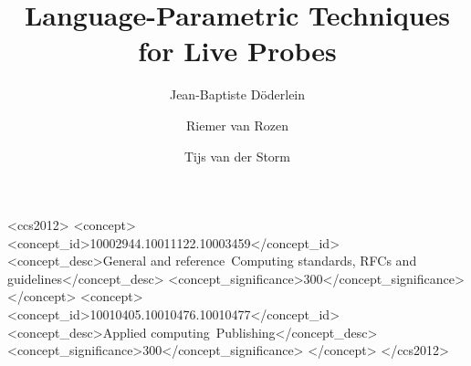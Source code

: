 \documentclass[english,submission]{programming}
\begin{document}
\title{Language-Parametric Techniques for Live Probes}

\author[a]{Jean-Baptiste Döderlein}
\author[b]{Riemer van Rozen}
\author[b,c]{Tijs van der Storm}




\begin{CCSXML}
<ccs2012>
<concept>
<concept_id>10002944.10011122.10003459</concept_id>
<concept_desc>General and reference~Computing standards, RFCs and guidelines</concept_desc>
<concept_significance>300</concept_significance>
</concept>
<concept>
<concept_id>10010405.10010476.10010477</concept_id>
<concept_desc>Applied computing~Publishing</concept_desc>
<concept_significance>300</concept_significance>
</concept>
</ccs2012>
\end{CCSXML}



\maketitle
\end{document}
